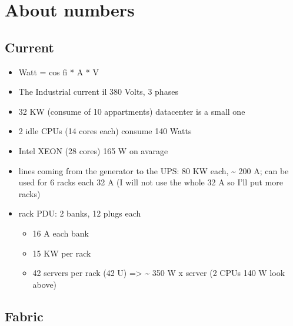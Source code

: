 \hypertarget{about-numbers}{%
\chapter{About numbers}\label{about-numbers}}

\hypertarget{current-1}{%
\section{Current}\label{current-1}}

\begin{itemize}
\item
  Watt = cos fi * A * V
\item
  The Industrial current il 380 Volts, 3 phases
\item
  32 KW (consume of 10 appartments) datacenter is a small one
\item
  2 idle CPUs (14 cores each) consume 140 Watts
\item
  Intel XEON (28 cores) 165 W on avarage
\item
  lines coming from the generator to the UPS: 80 KW each,
  \textasciitilde{} 200 A; can be used for 6 racks each 32 A (I will not
  use the whole 32 A so I'll put more racks)
\item
  rack PDU: 2 banks, 12 plugs each

  \begin{itemize}
  \item
    16 A each bank
  \item
    15 KW per rack
  \item
    42 servers per rack (42 U) =\textgreater{} \textasciitilde{} 350 W x
    server (2 CPUs 140 W look above)
  \end{itemize}
\end{itemize}

\hypertarget{fabric-1}{%
\section{Fabric}\label{fabric-1}}

